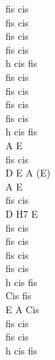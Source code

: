 \documentclass[a5paper, 10pt]{book}
\begin{document}
\begin{minipage}[t]{0.2\textwidth}
fis cis\\
fis cis\\
fis cis\\
fis cis\\
 h cis fis\\

fis cis\\
fis cis\\
fis cis\\
fis cis\\
 h cis fis\\
 
 A E\\
fis cis\\
 D E A (E)\\

  A E\\
fis cis\\
 D H7 E\\
 
fis cis\\
fis cis\\
fis cis\\
fis cis\\
 h cis fis\\

 
 Cis fis\\
E A Cis\\

fis cis\\
fis cis\\
 h cis fis\\
 

\end{minipage}

\newpage
\end{document}

